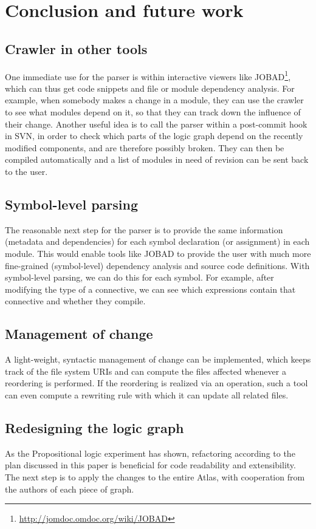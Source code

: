 \section{Conclusion and future work}

\subsection{Crawler in other tools}
One immediate use for the parser is within interactive viewers like JOBAD\footnote{\url{http://jomdoc.omdoc.org/wiki/JOBAD}}, which can thus get code snippets and file or module dependency analysis. For example, when somebody makes a change in a module, they can use the crawler to see what modules depend on it, so that they can track down the influence of their change. Another useful idea is to call the parser within a post-commit hook in SVN, in order to check which parts of the logic graph depend on the recently modified components, and are therefore possibly broken. They can then be compiled automatically and a list of modules in need of revision can be sent back to the user.

\subsection{Symbol-level parsing}
The reasonable next step for the parser is to provide the same information (metadata and dependencies) for each symbol declaration (or assignment) in each module. This would enable tools like JOBAD to provide the user with much more fine-grained (symbol-level) dependency analysis and source code definitions. With symbol-level parsing, we can do this for each symbol. For example, after modifying the type of a connective, we can see which expressions contain that connective and whether they compile.

\subsection{Management of change}

A light-weight, syntactic management of change can be
implemented, which keeps track of the file system URIs and can compute
the files affected whenever a reordering is performed. If the
reordering is realized via an  operation, such a tool
can even compute a rewriting rule with which it can update all related
files.

\subsection{Redesigning the logic graph}

As the Propositional logic experiment has shown, refactoring according to the plan discussed in this paper is beneficial for code readability and extensibility. The next step is to apply the changes to the entire Atlas, with cooperation from the authors of each piece of graph.




